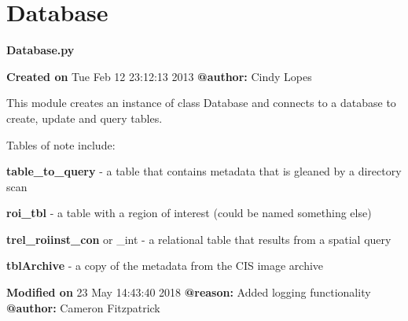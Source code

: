 \documentclass[letterpaper,10pt,openany,oneside]{sphinxmanual}
\begin{document}
\section{Database}
\label{code:database}\label{code:module-Database}
\textbf{Database.py}

\textbf{Created on} Tue Feb 12 23:12:13 2013 \textbf{@author:} Cindy Lopes

This module creates an instance of class Database and connects to a database to
create, update and query tables.

Tables of note include:

\textbf{table\_to\_query} - a table that contains metadata that is gleaned by a directory scan

\textbf{roi\_tbl} - a table with a region of interest (could be named something else)

\textbf{trel\_roiinst\_con} or \_int - a relational table that results from a spatial query

\textbf{tblArchive} - a copy of the metadata from the CIS image archive

\textbf{Modified on} 23 May 14:43:40 2018 \textbf{@reason:} Added logging functionality \textbf{@author:} Cameron Fitzpatrick
\end{document}
